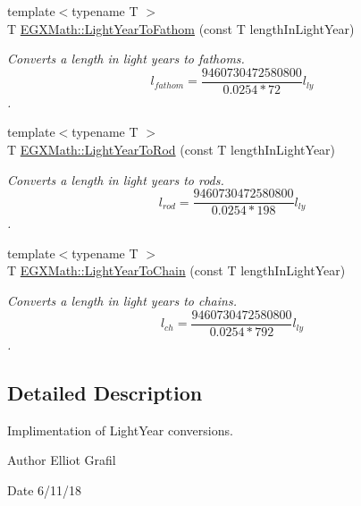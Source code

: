 \begin{DoxyCompactItemize}
{\footnotesize template$<$typename T $>$ }\\T \mbox{\hyperlink{group___e_g_x_math-_conversions-_length_conversions-_astronomical-_light_year-_nautical_gad53c415df3fcb65654ccf0d1cd79ef4a}{E\+G\+X\+Math\+::\+Light\+Year\+To\+Fathom}} (const T length\+In\+Light\+Year)
\begin{DoxyCompactList}\small\item\em Converts a length in light years to fathoms. \[ l_{fathom}= \frac{9460730472580800}{0.0254 * 72} l_{ly} \]. \end{DoxyCompactList}\item 
{\footnotesize template$<$typename T $>$ }\\T \mbox{\hyperlink{group___e_g_x_math-_conversions-_length_conversions-_astronomical-_light_year-_surveyors_ga8cb7f2e1dbbe56d0d87ce11015d4fdb6}{E\+G\+X\+Math\+::\+Light\+Year\+To\+Rod}} (const T length\+In\+Light\+Year)
\begin{DoxyCompactList}\small\item\em Converts a length in light years to rods. \[ l_{rod}= \frac{9460730472580800}{0.0254 * 198} l_{ly} \]. \end{DoxyCompactList}\item 
{\footnotesize template$<$typename T $>$ }\\T \mbox{\hyperlink{group___e_g_x_math-_conversions-_length_conversions-_astronomical-_light_year-_surveyors_gabfcaf18acf4aeceaaed2699ebc9c3e1d}{E\+G\+X\+Math\+::\+Light\+Year\+To\+Chain}} (const T length\+In\+Light\+Year)
\begin{DoxyCompactList}\small\item\em Converts a length in light years to chains. \[ l_{ch}= \frac{9460730472580800}{0.0254 * 792} l_{ly} \]. \end{DoxyCompactList}\end{DoxyCompactItemize}


\subsection{Detailed Description}
Implimentation of Light\+Year conversions. 

\begin{DoxyAuthor}{Author}
Elliot Grafil 
\end{DoxyAuthor}
\begin{DoxyDate}{Date}
6/11/18 
\end{DoxyDate}
